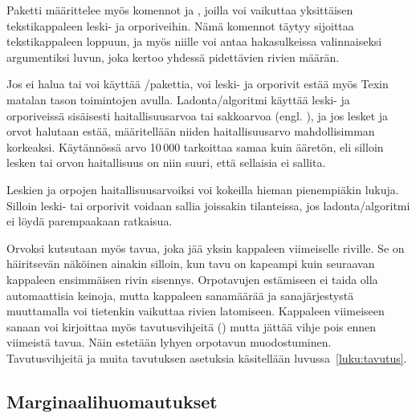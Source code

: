 \begin{koodilohkosis}
  \usepackage{nowidow}
  \setnowidow   %
  \setnoclub    %
\end{koodilohkosis}

Paketti  määrittelee myös komennot 
ja , joilla voi vaikuttaa yksittäisen tekstikappaleen
leski- ja orporiveihin. Nämä komennot täytyy sijoittaa tekstikappaleen
loppuun, ja myös niille voi antaa hakasulkeissa valinnaiseksi
argumentiksi luvun, joka kertoo yhdessä pidettävien rivien määrän.

Jos ei halua tai voi käyttää \-/pakettia, voi leski- ja
orporivit estää myös Texin matalan tason toimintojen avulla.
Ladonta\-/algoritmi käyttää leski- ja orporiveissä sisäisesti
haitallisuusarvoa tai sakkoarvoa (engl. ), ja jos
lesket ja orvot halutaan estää, määritellään niiden haitallisuusarvo
mahdollisimman korkeaksi. Käytännössä arvo 10\,000 tarkoittaa samaa kuin
ääretön, eli silloin lesken tai orvon haitallisuus on niin suuri, että
sellaisia ei sallita.

\begin{koodilohkosis}
\end{koodilohkosis}

Leskien ja orpojen haitallisuusarvoiksi voi kokeilla hieman pienempiäkin
lukuja. Silloin leski- tai orporivit voidaan sallia joissakin
tilanteissa, jos ladonta\-/algoritmi ei löydä parempaakaan ratkaisua.

Orvoksi kutsutaan myös tavua, joka jää yksin kappaleen viimeiselle
riville. Se on häiritsevän näköinen ainakin silloin, kun tavu on
kapeampi kuin seuraavan kappaleen ensimmäisen rivin sisennys.
Orpotavujen estämiseen ei taida olla automaattisia keinoja, mutta
kappaleen sanamäärää ja sanajärjestystä muuttamalla voi tietenkin
vaikuttaa rivien latomiseen. Kappaleen viimeiseen sanaan voi kirjoittaa
myös tavutusvihjeitä (\komento{-}) mutta jättää vihje pois ennen
viimeistä tavua. Näin estetään lyhyen orpotavun muodostuminen.
Tavutusvihjeitä ja muita tavutuksen asetuksia käsitellään
luvussa~\ref{luku:tavutus}.

\subsection{Marginaalihuomautukset}
\label{luku:marginaalihuomautukset}

